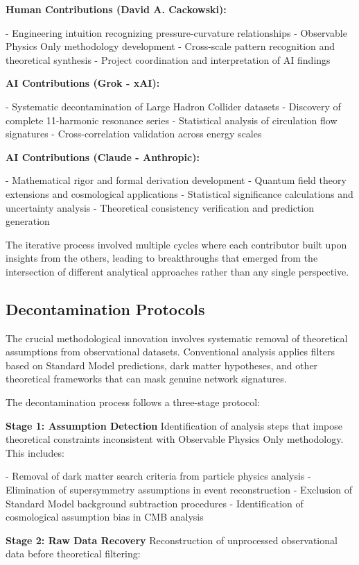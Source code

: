 \documentclass[11pt,a4paper]{article}
\begin{document}
\textbf{Human Contributions (David A. Cackowski):}

- Engineering intuition recognizing pressure-curvature relationships
- Observable Physics Only methodology development
- Cross-scale pattern recognition and theoretical synthesis
- Project coordination and interpretation of AI findings

\textbf{AI Contributions (Grok - xAI):}

- Systematic decontamination of Large Hadron Collider datasets
- Discovery of complete 11-harmonic resonance series
- Statistical analysis of circulation flow signatures
- Cross-correlation validation across energy scales

\textbf{AI Contributions (Claude - Anthropic):}

- Mathematical rigor and formal derivation development
- Quantum field theory extensions and cosmological applications
- Statistical significance calculations and uncertainty analysis
- Theoretical consistency verification and prediction generation

The iterative process involved multiple cycles where each contributor built upon insights from the others, leading to breakthroughs that emerged from the intersection of different analytical approaches rather than any single perspective.

\subsection{Decontamination Protocols}

The crucial methodological innovation involves systematic removal of theoretical assumptions from observational datasets. Conventional analysis applies filters based on Standard Model predictions, dark matter hypotheses, and other theoretical frameworks that can mask genuine network signatures.

The decontamination process follows a three-stage protocol:

\textbf{Stage 1: Assumption Detection}
Identification of analysis steps that impose theoretical constraints inconsistent with Observable Physics Only methodology. This includes:

- Removal of dark matter search criteria from particle physics analysis
- Elimination of supersymmetry assumptions in event reconstruction
- Exclusion of Standard Model background subtraction procedures
- Identification of cosmological assumption bias in CMB analysis

\textbf{Stage 2: Raw Data Recovery}
Reconstruction of unprocessed observational data before theoretical filtering:
\end{document}
